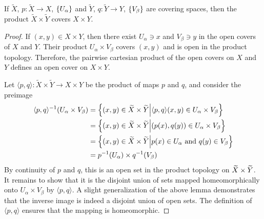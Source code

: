 \documentclass[a5paper]{article}
\begin{document}
\begin{proposition*}
	If $\tilde{X}$, $p:\tilde{X}\to X$, $\left\{U_\alpha\right\}$ and $\tilde{Y}$,
  $q:\tilde{Y}\to Y$, $\left\{V_\beta\right\}$ are covering spaces, then the product
  $\tilde{X}\times\tilde{Y}$ covers $X\times Y$.
\end{proposition*}
\begin{proof}
  If $(x,y)\in X\times Y$, then there exist $U_\alpha\ni x$ and $V_\beta\ni y$
  in the open covers of $X$ and $Y$. Their product $U_\alpha\times V_\beta$
  covers $(x,y)$ and is open in the product topology. Therefore, the pairwise
  cartesian product of the open covers on $X$ and $Y$ defines an open cover on
  $X\times Y$.

  Let $\langle p,q \rangle:\widetilde{X}\times \widetilde{Y}\to X\times Y$ be
  the product of maps $p$ and $q$, and consider the preimage
  \begin{align*}
    \langle p,q \rangle^{-1}(U_\alpha\times V_\beta)
    &= \left\{(x,y)\in \widetilde{X}\times\widetilde{Y}\Big|\langle p,q \rangle(x,y)\in U_\alpha\times V_\beta\right\} \\
    &= \left\{(x,y)\in \widetilde{X}\times\widetilde{Y}\Big|(p(x),q(y))\in U_\alpha\times V_\beta\right\} \\
    &= \left\{(x,y)\in \widetilde{X}\times\widetilde{Y}\Big|p(x)\in U_\alpha\text{ and }q(y)\in V_\beta\right\} \\
    &= p^{-1}(U_\alpha)\times q^{-1}(V_\beta)
  \end{align*}
  By continuity of $p$ and $q$, this is an open set in the product topology on
  $\widetilde{X}\times \widetilde{Y}$.
  It remains to show that it is the disjoint union of sets
  mapped homeomorphically onto $U_\alpha\times V_\beta$ by $\langle p,q \rangle$.
  A slight generalization of the above lemma demonstrates that the inverse image
  is indeed a disjoint union of open sets. The definition of
  $\langle p,q \rangle$ ensures that the mapping is homeomorphic.
\end{proof}


\end{document}
